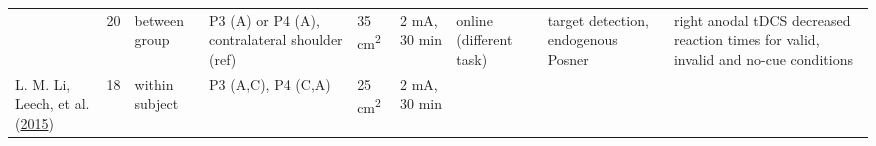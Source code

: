 \documentclass[11pt,]{memoir}
\begin{document}
\begin{longtable}[]{@{}lllllllll@{}}
\begin{minipage}[t]{0.12\columnwidth}
\end{minipage} & \begin{minipage}[t]{0.02\columnwidth}\raggedright
20\strut
\end{minipage} & \begin{minipage}[t]{0.04\columnwidth}\raggedright
between
group\strut
\end{minipage} & \begin{minipage}[t]{0.11\columnwidth}\raggedright
P3 (A) or P4 (A),
contralateral shoulder
(ref)\strut
\end{minipage} & \begin{minipage}[t]{0.03\columnwidth}\raggedright
35
cm\textsuperscript{2}\strut
\end{minipage} & \begin{minipage}[t]{0.05\columnwidth}\raggedright
2 mA, 30
min\strut
\end{minipage} & \begin{minipage}[t]{0.05\columnwidth}\raggedright
online
(different
task)\strut
\end{minipage} & \begin{minipage}[t]{0.11\columnwidth}\raggedright
target detection,
endogenous Posner\strut
\end{minipage} & \begin{minipage}[t]{0.24\columnwidth}\raggedright
right anodal tDCS decreased reaction times for valid,
invalid and no-cue conditions\strut
\end{minipage}\tabularnewline
\begin{minipage}[t]{0.12\columnwidth}\raggedright
L. M. Li, Leech, et al. (\protect\hyperlink{ref-Li2015a}{2015})\strut
\end{minipage} & \begin{minipage}[t]{0.02\columnwidth}\raggedright
18\strut
\end{minipage} & \begin{minipage}[t]{0.04\columnwidth}\raggedright
within
subject\strut
\end{minipage} & \begin{minipage}[t]{0.11\columnwidth}\raggedright
P3 (A,C), P4 (C,A)\strut
\end{minipage} & \begin{minipage}[t]{0.03\columnwidth}\raggedright
25
cm\textsuperscript{2}\strut
\end{minipage} & \begin{minipage}[t]{0.05\columnwidth}\raggedright
2 mA, 30
min\strut
\end{minipage} & \begin{minipage}[t]{0.05\columnwidth}\raggedright

\end{minipage}
\end{longtable}
\end{document}

